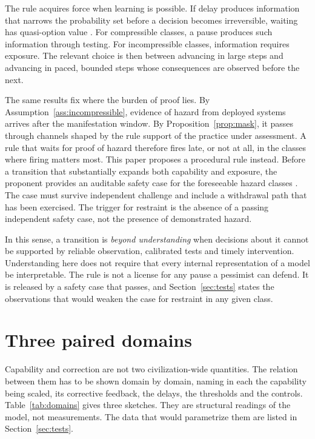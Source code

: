 \documentclass[11pt]{article}
\theoremstyle{plain}
\theoremstyle{definition}
\begin{document}
The rule acquires force when learning is possible. If delay produces information that narrows the probability set before a decision becomes irreversible, waiting has quasi-option value \citep{arrowfisher1974,henry1974,gollier2000}. For compressible classes, a pause produces such information through testing. For incompressible classes, information requires exposure. The relevant choice is then between advancing in large steps and advancing in paced, bounded steps whose consequences are observed before the next.

The same results fix where the burden of proof lies. By Assumption~\ref{ass:incompressible}, evidence of hazard from deployed systems arrives after the manifestation window. By Proposition~\ref{prop:mask}, it passes through channels shaped by the rule support of the practice under assessment. A rule that waits for proof of hazard therefore fires late, or not at all, in the classes where firing matters most. This paper proposes a procedural rule instead. Before a transition that substantially expands both capability and exposure, the proponent provides an auditable safety case for the foreseeable hazard classes \citep{clymer2024,buhl2024}. The case must survive independent challenge and include a withdrawal path that has been exercised. The trigger for restraint is the absence of a passing independent safety case, not the presence of demonstrated hazard.

In this sense, a transition is \emph{beyond understanding} when decisions about it cannot be supported by reliable observation, calibrated tests and timely intervention. Understanding here does not require that every internal representation of a model be interpretable. The rule is not a license for any pause a pessimist can defend. It is released by a safety case that passes, and Section~\ref{sec:tests} states the observations that would weaken the case for restraint in any given class.

\section{Three paired domains}\label{sec:domains}

Capability and correction are not two civilization-wide quantities. The relation between them has to be shown domain by domain, naming in each the capability being scaled, its corrective feedback, the delays, the thresholds and the controls. Table~\ref{tab:domains} gives three sketches. They are structural readings of the model, not measurements. The data that would parametrize them are listed in Section~\ref{sec:tests}.
\end{document}
